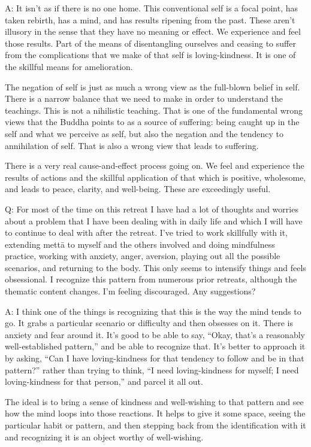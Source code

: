 \qaspace
A: It isn’t as if there is no one home. This conventional self is a
focal point, has taken rebirth, has a mind, and has results ripening
from the past. These aren’t illusory in the sense that they have no
meaning or effect. We experience and feel those results. Part of the
means of disentangling ourselves and ceasing to suffer from the
complications that we make of that self is loving-kindness. It is one of
the skillful means for amelioration.

The negation of self is just as much a wrong view as the full-blown
belief in self. There is a narrow balance that we need to make in order
to understand the teachings. This is not a nihilistic teaching. That is
one of the fundamental wrong views that the Buddha points to as a source
of suffering: being caught up in the self and what we perceive as self,
but also the negation and the tendency to annihilation of self. That is
also a wrong view that leads to suffering.

There is a very real cause-and-effect process going on. We feel and
experience the results of actions and the skillful application of that
which is positive, wholesome, and leads to peace, clarity, and
well-being. These are exceedingly useful.

\qaspace
Q: For most of the time on this retreat I have had a lot of thoughts and
worries about a problem that I have been dealing with in daily life and
which I will have to continue to deal with after the retreat. I’ve tried
to work skillfully with it, extending mettā to myself and the others
involved and doing mindfulness practice, working with anxiety, anger,
aversion, playing out all the possible scenarios, and returning to the
body. This only seems to intensify things and feels obsessional. I
recognize this pattern from numerous prior retreats, although the
thematic content changes. I’m feeling discouraged. Any suggestions?

\qaspace
A: I think one of the things is recognizing that this is the way the
mind tends to go. It grabs a particular scenario or difficulty and then
obsesses on it. There is anxiety and fear around it. It’s good to be
able to say, “Okay, that’s a reasonably well-established pattern,” and
be able to recognize that. It’s better to approach it by asking, “Can I
have loving-kindness for that tendency to follow and be in that
pattern?” rather than trying to think, “I need loving-kindness for
myself; I need loving-kindness for that person,” and parcel it all out.

The ideal is to bring a sense of kindness and well-wishing to that
pattern and see how the mind loops into those reactions. It helps to
give it some space, seeing the particular habit or pattern, and then
stepping back from the identification with it and recognizing it is an
object worthy of well-wishing.

